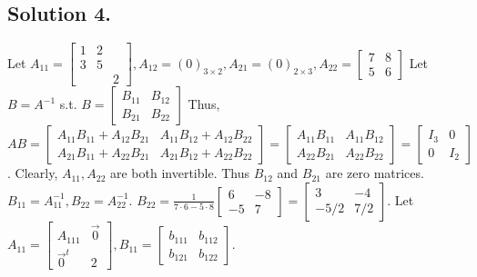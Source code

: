 \documentclass{article}
\begin{document}
\subsection*{Solution 4.}
Let $A_{11}=\left[\begin{array}{rrr}1&2\\3&5\\&&2\end{array}\right],A_{12}=(0)_{3 \times 2}, A_{21}=(0)_{2\times 3}, A_{22}=\left[\begin{array}{rr}7&8\\5&6\end{array}\right]$\newline
Let $B=A^{-1}$ s.t. $B=\left[\begin{array}{rr}B_{11}&B_{12}\\B_{21}&B_{22}\end{array}\right]$\newline
Thus, $AB=\left[\begin{array}{rr}A_{11}B_{11}+A_{12}B_{21}&A_{11}B_{12}+A_{12}B_{22}\\A_{21}B_{11}+A_{22}B_{21}&A_{21}B_{12}+A_{22}B_{22}\end{array}\right]=\left[\begin{array}{rr}A_{11}B_{11}&A_{11}B_{12}\\A_{22}B_{21}&A_{22}B_{22}\end{array}\right]=\left[\begin{array}{rr}I_3&0\\0&I_2\end{array}\right]$.\newline
Clearly, $A_{11},A_{22}$ are both invertible. Thus $B_{12}$ and $B_{21}$ are zero matrices.\newline
$B_{11}=A_{11}^{-1}, B_{22}=A_{22}^{-1}$.
$B_{22}=\frac{1}{7\cdot 6- 5\cdot 8}\left[\begin{array}{rr}6&-8\\-5&7\end{array}\right]=\left[\begin{array}{rr}3&-4\\-5/2&7/2\end{array}\right]$.\newline
Let $A_{11}=\left[\begin{array}{rr}A_{111}&\Vec{0}\\\Vec{0}^t&2\end{array}\right],B_{11}=\left[\begin{array}{rr}b_{111}&b_{112}\\b_{121}&b_{122}\end{array}\right]$.
\end{document}
